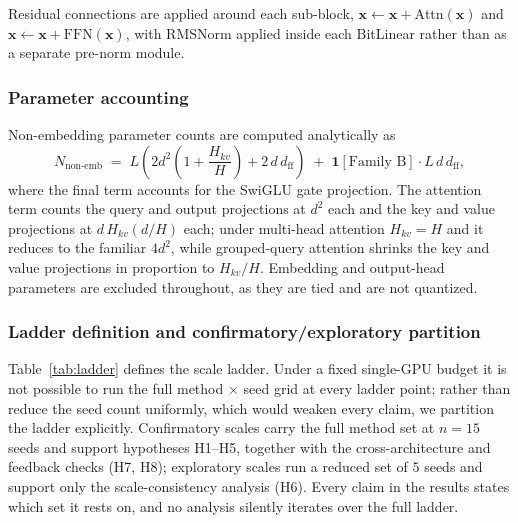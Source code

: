 \documentclass[final,5p,times,twocolumn]{elsarticle}
\theoremstyle{remark}
\newcommand{\xv}{\mathbf{x}}
\begin{document}
Residual connections are applied around each sub-block,
$\xv \leftarrow \xv + \mathrm{Attn}(\xv)$ and
$\xv \leftarrow \xv + \mathrm{FFN}(\xv)$, with RMSNorm applied inside each
BitLinear rather than as a separate pre-norm module.

\subsubsection{Parameter accounting}

Non-embedding parameter counts are computed analytically as
\begin{equation}
\label{eq:nparams}
N_{\mathrm{non\text{-}emb}} \;=\;
L\left(2d^{2}\!\left(1 + \frac{H_{kv}}{H}\right) + 2\,d\,d_{\mathrm{ff}}\right)
\;+\; \mathbf{1}[\text{Family B}]\cdot L\,d\,d_{\mathrm{ff}},
\end{equation}
where the final term accounts for the SwiGLU gate projection. The attention
term counts the query and output projections at $d^{2}$ each and the key and
value projections at $d\,H_{kv}(d/H)$ each; under multi-head attention
$H_{kv}=H$ and it reduces to the familiar $4d^{2}$, while grouped-query
attention shrinks the key and value projections in proportion to $H_{kv}/H$.
Embedding and output-head parameters are excluded throughout, as they are
tied and are not quantized.

\subsubsection{Ladder definition and confirmatory/exploratory partition}

Table~\ref{tab:ladder} defines the scale ladder. Under a fixed single-GPU
budget it is not possible to run the full method $\times$ seed grid at every
ladder point; rather than reduce the seed count uniformly, which would weaken
every claim, we partition the ladder explicitly. Confirmatory scales
carry the full method set at $n = 15$ seeds and support hypotheses
H1--H5, together with the cross-architecture and feedback checks (H7, H8);
exploratory scales run a reduced set of $5$ seeds and support only the
scale-consistency analysis (H6). Every claim in the results states
which set it rests on, and no analysis silently iterates over the full ladder.
\end{document}
